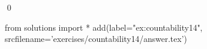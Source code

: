 
\begin{ex} 
  \label{ex:countability14}
  
  \qed
\end{ex} 
\begin{python0}
from solutions import *
add(label="ex:countability14",
    srcfilename='exercises/countability14/answer.tex') 
\end{python0}
